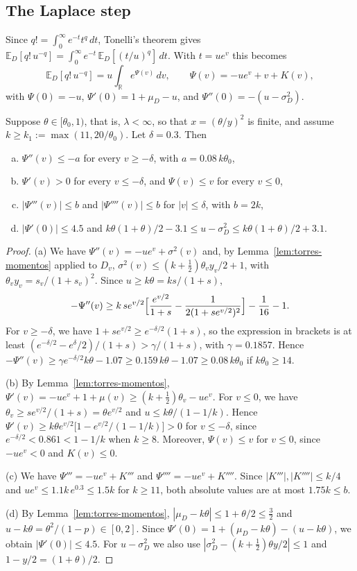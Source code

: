 \subsection{The Laplace step}

Since $q!=\int_0^\infty e^{-t}t^q\,dt$, Tonelli's theorem gives
$\mathbb E_D[q!\,u^{-q}]=\int_0^\infty e^{-t}\,\mathbb E_D[(t/u)^q]\,dt$. With $t=ue^v$ this becomes
\begin{equation}\label{eq:torres-laplace}
 \mathbb E_D[q!\,u^{-q}]=u\int_{\mathbb R}e^{\Psi(v)}\,dv,\qquad \Psi(v)=-ue^v+v+K(v),
\end{equation}
with $\Psi(0)=-u$, $\Psi'(0)=1+\mu_D-u$, and $\Psi''(0)=-(u-\sigma_D^2)$.

\begin{lema}\label{lem:torres-psi}
Suppose $\theta\in[\theta_0,1)$, that is, $\lambda<\infty$, so that $x=(\theta/y)^2$ is finite, and assume
$k\ge k_1:=\max(11,20/\theta_0)$. Let $\delta=0.3$. Then
\begin{enumerate}[(a)]
\item $\Psi''(v)\le-a$ for every $v\ge-\delta$, with $a=0.08\,k\theta_0$,
\item $\Psi'(v)>0$ for every $v\le-\delta$, and $\Psi(v)\le v$ for every $v\le0$,
\item $|\Psi'''(v)|\le b$ and $|\Psi''''(v)|\le b$ for $|v|\le\delta$, with $b=2k$,
\item $|\Psi'(0)|\le4.5$ and $k\theta(1+\theta)/2-3.1\le u-\sigma_D^2\le k\theta(1+\theta)/2+3.1$.
\end{enumerate}
\end{lema}
\begin{proof}
(a) We have $\Psi''(v)=-ue^v+\sigma^2(v)$ and, by Lemma~\ref{lem:torres-momentos} applied to $D_v$,
$\sigma^2(v)\le(k+\frac12)\theta_vy_v/2+1$, with $\theta_vy_v=s_v/(1+s_v)^2$. Since $u\ge k\theta=ks/(1+s)$,
\[
 -\Psi''(v)\ge k\,se^{v/2}\Bigl[\frac{e^{v/2}}{1+s}-\frac1{2(1+se^{v/2})^2}\Bigr]-\frac1{16}-1.
\]
For $v\ge-\delta$, we have $1+se^{v/2}\ge e^{-\delta/2}(1+s)$, so the expression in brackets is at least
$(e^{-\delta/2}-e^\delta/2)/(1+s)>\gamma/(1+s)$, with $\gamma=0.1857$. Hence
$-\Psi''(v)\ge\gamma e^{-\delta/2}k\theta-1.07\ge0.159\,k\theta-1.07\ge0.08\,k\theta_0$ if
$k\theta_0\ge14$.

(b) By Lemma~\ref{lem:torres-momentos}, $\Psi'(v)=-ue^v+1+\mu(v)\ge(k+\frac12)\theta_v-ue^v$. For
$v\le0$, we have $\theta_v\ge se^{v/2}/(1+s)=\theta e^{v/2}$ and $u\le k\theta/(1-1/k)$. Hence
$\Psi'(v)\ge k\theta e^{v/2}\bigl[1-e^{v/2}/(1-1/k)\bigr]>0$ for $v\le-\delta$, since
$e^{-\delta/2}<0.861<1-1/k$ when $k\ge8$. Moreover, $\Psi(v)\le v$ for $v\le0$, since $-ue^v<0$ and
$K(v)\le0$.

(c) We have $\Psi'''=-ue^v+K'''$ and $\Psi''''=-ue^v+K''''$. Since $|K'''|,|K''''|\le k/4$ and
$ue^v\le1.1k\,e^{0.3}\le1.5k$ for $k\ge11$, both absolute values are at most $1.75k\le b$.

(d) By Lemma~\ref{lem:torres-momentos}, $|\mu_D-k\theta|\le1+\theta/2\le\frac32$ and
$u-k\theta=\theta^2/(1-p)\in[0,2]$. Since $\Psi'(0)=1+(\mu_D-k\theta)-(u-k\theta)$, we obtain
$|\Psi'(0)|\le4.5$. For $u-\sigma_D^2$ we also use $|\sigma_D^2-(k+\frac12)\theta y/2|\le1$ and
$1-y/2=(1+\theta)/2$.
\end{proof}

